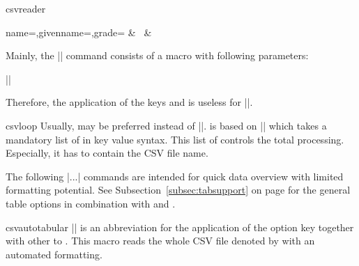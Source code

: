 \documentclass[a4paper,11pt]{ltxdoc}
\begin{document}
\begin{docCommand}{csvreader}{}
\begin{dispExample}
%
  {name=\name,givenname=\firstname,grade=\grade}%
  {\grade & \firstname~\name & \csvcoliii}
\end{dispExample}

Mainly, the |\csvreader| command consists of a  macro with
following parameters:\par
||\par
  Therefore, the application of the keys  and 
is useless for |\csvreader|.
\end{docCommand}

\begin{docCommand}{csvloop}{}
  Usually,  may be preferred instead of |\csvloop|.
   is based on |\csvloop| which takes a mandatory list of
   in key value syntax.
  This list of  controls the total processing. Especially,
  it has to contain the CSV file name.
\begin{dispExample}
\end{dispExample}
\end{docCommand}

\clearpage
The following |\csvauto...| commands are intended for quick data overview
with limited formatting potential.
See Subsection~\ref{subsec:tabsupport} on page \pageref{subsec:tabsupport}
for the general table options in combination with  and
.

\begin{docCommand}{csvautotabular}{}
  |\csvautotabular| is an abbreviation for the application of the option key
   together with other  to .
  This macro reads the whole CSV file denoted by 
  with an automated formatting.
\begin{dispExample}
\end{dispExample}
\begin{dispExample}
\end{dispExample}
\end{docCommand}
\end{document}
